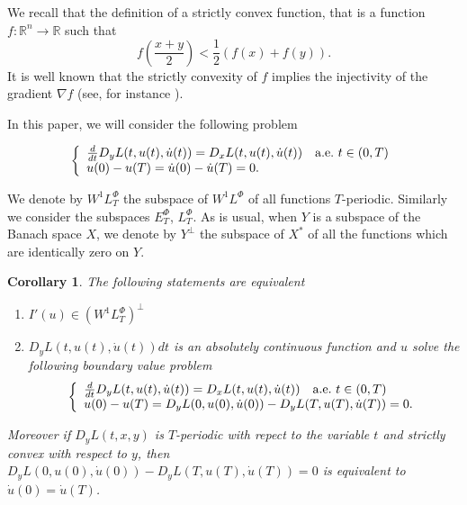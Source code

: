 \documentclass[twoside]{article}
\newtheorem{cor}[thm]{Corollary}
\newcommand{\lphi}{L^{\Phi}}
\newcommand{\ephi}{E^{\Phi}}
\newcommand{\wphi}{W^{1}\lphi}
\begin{document}
We recall that the definition of a strictly convex function, that is a function $f: \mathbb{R}^n \to \mathbb{R}$ such that
\[
f\left(\frac{x+y}{2}\right)< \frac{1}{2} \left(f\left( x\right)+f\left( y\right)\right).
\]
It is well known that the strictly convexity of $f$ implies the injectivity of the gradient $\nabla f$ (see, for instance \cite[Theorem
12.17]{rockafellar2009variational}).

In this paper, we will consider the following problem


\begin{equation}\label{ecualagran}
    \left\{%
\begin{array}{ll}
   \frac{d}{dt} D_{y}L(t,u(t),\dot{u}(t))= D_{x}L(t,u(t),\dot{u}(t)) \quad \hbox{a.e.}\ t \in (0,T)\\
    u(0)-u(T)=\dot{u}(0)-\dot{u}(T)=0.
\end{array}%
\right.
\end{equation}

We denote by $\wphi_T$ the subspace of $\wphi$ of all functions $T$-periodic. Similarly we consider the subspaces $\ephi_T$, $\lphi_T$. As is usual, when $Y$ is a subspace of
the Banach space $X$, we denote by $Y^{\perp}$ the subspace of $X^*$ of all the functions which are identically zero on $Y$. 

\begin{cor} The following statements are equivalent
\begin{enumerate}
 \item $I'(u)\in\left( \wphi_T\right)^{\perp}$
 \item  $D_yL(t,u(t),\dot{u}(t))dt$ is an absolutely continuous function and $u$ solve the following boundary value problem
 \begin{equation}\label{ecualagran2}
    \left\{%
\begin{array}{ll}
   \frac{d}{dt} D_{y}L(t,u(t),\dot{u}(t))= D_{x}L(t,u(t),\dot{u}(t)) \quad \hbox{a.e.}\ t \in (0,T)\\
    u(0)-u(T)=D_yL(0,u(0),\dot{u}(0))-D_yL(T,u(T),\dot{u}(T))=0.
\end{array}%
\right.
\end{equation}

\end{enumerate}
Moreover if $D_yL(t,x,y)$ is $T$-periodic with repect to the variable $t$ and strictly convex with respect to $y$, then $D_yL(0,u(0),\dot{u}(0))-D_yL(T,u(T),\dot{u}(T))=0$ is 
equivalent to $\dot{u}(0)=\dot{u}(T)$. 
 
\end{cor}
\end{document}
